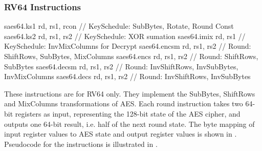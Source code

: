 


\newpage
\subsubsection{RV64 Instructions}
\label{sec:scalar:aes:rv64}

\begin{cryptoisa}
saes64.ks1   rd, rs1, rcon // KeySchedule: SubBytes, Rotate, Round Const
saes64.ks2   rd, rs1, rs2  // KeySchedule: XOR sumation
saes64.imix  rd, rs1       // KeySchedule: InvMixColumns for Decrypt
saes64.encsm rd, rs1, rs2  // Round:    ShiftRows,    SubBytes,    MixColumns
saes64.encs  rd, rs1, rs2  // Round:    ShiftRows,    SubBytes
saes64.decsm rd, rs1, rs2  // Round: InvShiftRows, InvSubBytes, InvMixColumns
saes64.decs  rd, rs1, rs2  // Round: InvShiftRows, InvSubBytes
\end{cryptoisa}

These instructions are for RV64 only.
They implement the SubBytes, ShiftRows and MixColumns transformations of AES.
Each round instruction takes two 64-bit registers as input, representing
the 128-bit state of the AES cipher, and outputs one 64-bit
result, i.e. half of the next round state.
The byte mapping of input register values to AES state and output register
values is shown in .
Pseudocode for the instructions is illustrated in
.

